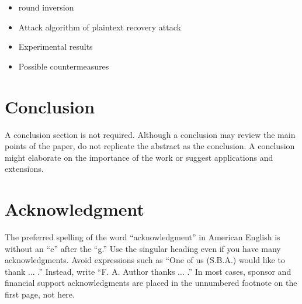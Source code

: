 \documentclass{ieeeaccess}
\begin{document}
\begin{itemize}
\item round inversion
\item Attack algorithm of plaintext recovery attack
\item Experimental results
\item Possible countermeasures
\end{itemize}


\section{Conclusion}
A conclusion section is not required. Although a conclusion may review the 
main points of the paper, do not replicate the abstract as the conclusion. A 
conclusion might elaborate on the importance of the work or suggest 
applications and extensions. 

\section*{Acknowledgment}

The preferred spelling of the word ``acknowledgment'' in American English is 
without an ``e'' after the ``g.'' Use the singular heading even if you have 
many acknowledgments. Avoid expressions such as ``One of us (S.B.A.) would 
like to thank $\ldots$ .'' Instead, write ``F. A. Author thanks $\ldots$ .'' In most 
cases, sponsor and financial support acknowledgments are placed in the 
unnumbered footnote on the first page, not here.
\end{document}
